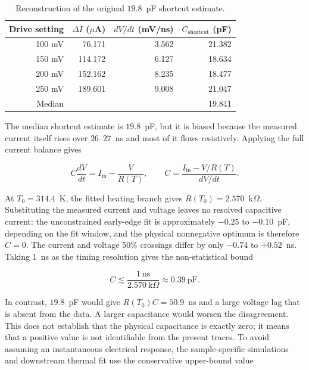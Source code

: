 \documentclass[11pt]{article}
\begin{document}
\begin{table}[H]
\centering
\small
{}
\begin{tabular}{@{}r r r r@{}}
\toprule
Drive setting & $\Delta I$ ($\mu$A) & $dV/dt$ (mV/ns) & $C_{\mathrm{shortcut}}$ (pF) \\
\midrule
100 mV & 76.171 & 3.562 & 21.382 \\
150 mV & 114.172 & 6.127 & 18.634 \\
200 mV & 152.162 & 8.235 & 18.477 \\
250 mV & 189.601 & 9.008 & 21.047 \\
\midrule
Median & & & 19.841 \\
\bottomrule
\end{tabular}
\caption{Reconstruction of the original $19.8$~pF shortcut estimate.}
\label{tab:discarded_capacitance}
\end{table}

The median shortcut estimate is $19.8$~pF, but it is biased because the measured current itself rises over $26$--$27$~ns and most of it flows resistively. Applying the full current balance gives

\begin{equation}
C\frac{dV}{dt}=I_{\mathrm{in}}-\frac{V}{R(T)},
\qquad
C=\frac{I_{\mathrm{in}}-V/R(T)}{dV/dt}.
\end{equation}

At $T_0=314.4$~K, the fitted heating branch gives $R(T_0)=2.570$~k$\Omega$. Substituting the measured current and voltage leaves no resolved capacitive current: the unconstrained early-edge fit is approximately $-0.25$ to $-0.10$~pF, depending on the fit window, and the physical nonnegative optimum is therefore $C=0$. The current and voltage 50\% crossings differ by only $-0.74$ to $+0.52$~ns. Taking 1~ns as the timing resolution gives the non-statistical bound

\begin{equation}
C\lesssim\frac{1~\mathrm{ns}}{2.570~\mathrm{k}\Omega}\approx0.39~\mathrm{pF}.
\end{equation}

In contrast, $19.8$~pF would give $R(T_0)C=50.9$~ns and a large voltage lag that is absent from the data. A larger capacitance would worsen the disagreement. This does not establish that the physical capacitance is exactly zero; it means that a positive value is not identifiable from the present traces. To avoid assuming an instantaneous electrical response, the sample-specific simulations and downstream thermal fit use the conservative upper-bound value
\end{document}

